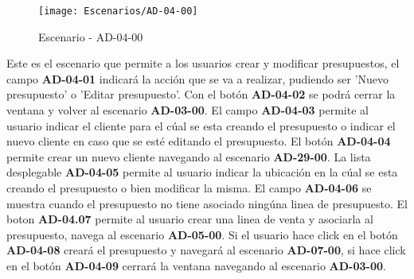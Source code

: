 \begin{figure}[H]
\centering
\texttt{[image: Escenarios/AD-04-00]}
\caption{Escenario - AD-04-00}
\label{fig:AD-04-00}
\end{figure}
Este es el escenario que permite a los usuarios crear y modificar presupuestos, el campo \textbf{AD-04-01} indicará la acción que se va a realizar, pudiendo ser 'Nuevo presupuesto' o 'Editar presupuesto'. Con el botón \textbf{AD-04-02} se podrá cerrar la ventana y volver al escenario \textbf{AD-03-00}.
El campo \textbf{AD-04-03} permite al usuario indicar el cliente para el cúal se esta creando el presupuesto o indicar el nuevo cliente en caso que se esté editando el presupuesto. El botón \textbf{AD-04-04} permite crear un nuevo cliente navegando al escenario \textbf{AD-29-00}. La lista desplegable \textbf{AD-04-05} permite al usuario indicar la ubicación en la cúal se esta creando el presupuesto o bien modificar la misma. El campo \textbf{AD-04-06} se muestra cuando el presupuesto no tiene asociado ningúna linea de presupuesto. El boton \textbf{AD-04.07} permite al usuario crear una linea de venta y asociarla al presupuesto, navega al escenario \textbf{AD-05-00}. Si el usuario hace click en el botón \textbf{AD-04-08} creará el presupuesto y navegará al escenario \textbf{AD-07-00}, si hace click en el botón \textbf{AD-04-09} cerrará la ventana navegando al escenario \textbf{AD-03-00}.
\clearpage
